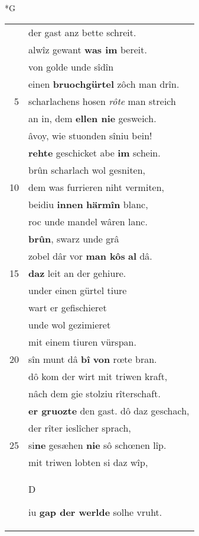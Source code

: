 \documentclass[8pt,a4paper,notitlepage]{article}
\begin{document}
\begin{table}[ht]
\begin{minipage}[t]{0.5\linewidth}
\small
\begin{center}*G
\end{center}
\begin{tabular}{rl}
 & der gast anz bette schreit.\\ 
 & alwîz gewant \textbf{was im} bereit.\\ 
 & von golde unde sîdîn\\ 
 & einen \textbf{bruochgürtel} zôch man drîn.\\ 
5 & scharlachens hosen \textit{rôte} man streich\\ 
 & an in, dem \textbf{ellen nie} gesweich.\\ 
 & âvoy, wie stuonden sîniu bein!\\ 
 & \textbf{rehte} geschicket abe \textbf{im} schein.\\ 
 & brûn scharlach wol gesniten,\\ 
10 & dem was furrieren niht vermiten,\\ 
 & beidiu \textbf{innen} \textbf{härmîn} blanc,\\ 
 & roc unde mandel wâren lanc.\\ 
 & \textbf{brûn}, swarz unde grâ\\ 
 & zobel dâr vor \textbf{man kôs} \textbf{al} dâ.\\ 
15 & \textbf{daz} leit an der gehiure.\\ 
 & under einen gürtel tiure\\ 
 & wart er gefischieret\\ 
 & unde wol gezimieret\\ 
 & mit einem tiuren vürspan.\\ 
20 & sîn munt dâ \textbf{bî} \textbf{von} rœte bran.\\ 
 & dô kom der wirt mit triwen kraft,\\ 
 & nâch dem gie stolziu rîterschaft.\\ 
 & \textbf{er gruozte} den gast. dô daz geschach,\\ 
 & der rîter ieslîcher sprach,\\ 
25 & si\textbf{ne} gesæhen \textbf{nie} sô schœnen lîp.\\ 
 & mit triwen lobten si daz wîp,\\ 
 & \begin{large}D\end{large}iu \textbf{gap der werlde} solhe vruht.\\ 

\end{tabular}
\end{minipage}
\end{table}
\end{document}
